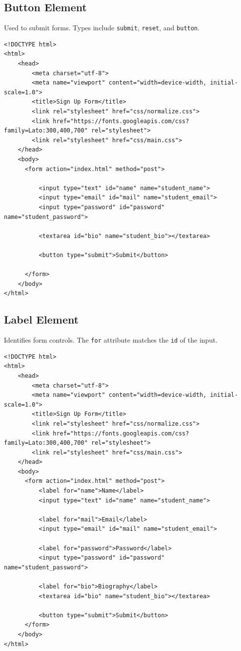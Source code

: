 \documentclass[12pt,a4paper]{article}
\begin{document}
\subsection*{Button Element}
Used to submit forms. Types include \texttt{submit}, \texttt{reset}, and \texttt{button}.
\begin{verbatim}
<!DOCTYPE html>
<html>
    <head>
        <meta charset="utf-8">
        <meta name="viewport" content="width=device-width, initial-scale=1.0">
        <title>Sign Up Form</title>
        <link rel="stylesheet" href="css/normalize.css">
        <link href="https://fonts.googleapis.com/css?family=Lato:300,400,700" rel="stylesheet">
        <link rel="stylesheet" href="css/main.css">
    </head>
    <body>
      <form action="index.html" method="post">
        
          <input type="text" id="name" name="student_name">
          <input type="email" id="mail" name="student_email">
          <input type="password" id="password" name="student_password">
          
          <textarea id="bio" name="student_bio"></textarea>
          
          <button type="submit">Submit</button>
        
      </form>
    </body>
</html>
\end{verbatim}

\subsection*{Label Element}
Identifies form controls. The \texttt{for} attribute matches the \texttt{id} of the input.
\begin{verbatim}
<!DOCTYPE html>
<html>
    <head>
        <meta charset="utf-8">
        <meta name="viewport" content="width=device-width, initial-scale=1.0">
        <title>Sign Up Form</title>
        <link rel="stylesheet" href="css/normalize.css">
        <link href="https://fonts.googleapis.com/css?family=Lato:300,400,700" rel="stylesheet">
        <link rel="stylesheet" href="css/main.css">
    </head>
    <body>
      <form action="index.html" method="post">
          <label for="name">Name</label>
          <input type="text" id="name" name="student_name">

          <label for="mail">Email</label>
          <input type="email" id="mail" name="student_email">

          <label for="password">Password</label>
          <input type="password" id="password" name="student_password">

          <label for="bio">Biography</label>
          <textarea id="bio" name="student_bio"></textarea>

          <button type="submit">Submit</button>
      </form>
    </body>
</html>
\end{verbatim}
\end{document}

